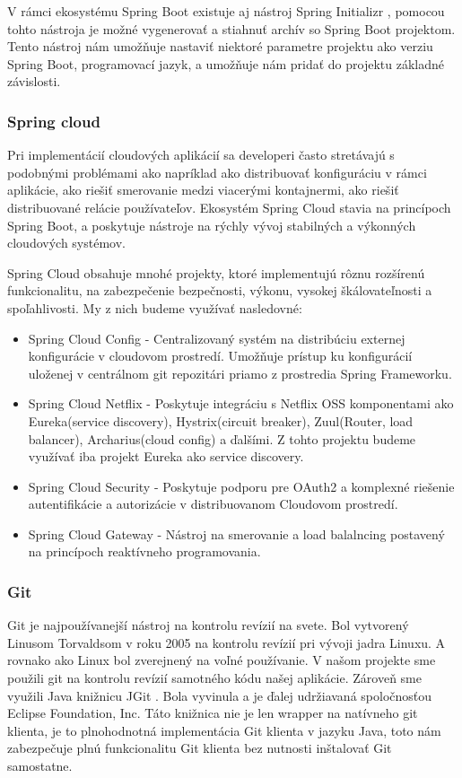 V rámci ekosystému Spring Boot existuje aj nástroj Spring Initializr \cite{initializr}, pomocou tohto nástroja je možné vygenerovať a stiahnuť archív so Spring Boot projektom. Tento nástroj nám umožňuje nastaviť niektoré parametre projektu ako verziu Spring Boot, programovací jazyk, a umožňuje nám pridať do projektu základné závislosti.   

\subsubsection{Spring cloud}
Pri implementácií cloudových aplikácií sa developeri často stretávajú s podobnými problémami ako napríklad ako distribuovať konfiguráciu v rámci aplikácie, ako riešiť smerovanie medzi viacerými kontajnermi, ako riešiť distribuované relácie používateľov. Ekosystém Spring Cloud stavia na princípoch Spring Boot, a poskytuje nástroje na rýchly vývoj stabilných a výkonných cloudových systémov. 

Spring Cloud obsahuje mnohé projekty, ktoré implementujú rôznu rozšírenú funkcionalitu, na zabezpečenie bezpečnosti, výkonu, vysokej škálovateľnosti a spoľahlivosti.
My z nich budeme využívať nasledovné:
\begin{itemize}
\item Spring Cloud Config - Centralizovaný systém na distribúciu externej konfigurácie v cloudovom prostredí. Umožňuje prístup ku konfigurácií uloženej v centrálnom git repozitári priamo z prostredia Spring Frameworku.
\item Spring Cloud Netflix - Poskytuje integráciu s Netflix OSS komponentami ako Eureka(service discovery), Hystrix(circuit breaker), Zuul(Router, load balancer), Archarius(cloud config) a ďalšími. Z tohto projektu budeme využívať iba projekt Eureka ako service discovery.
\item Spring Cloud Security - Poskytuje podporu pre OAuth2 a komplexné riešenie autentifikácie a autorizácie v distribuovanom Cloudovom prostredí.
\item Spring Cloud Gateway - Nástroj na smerovanie a load balalncing postavený na princípoch reaktívneho programovania.
\end{itemize}




\subsubsection{Git}
Git je najpoužívanejší nástroj na kontrolu revízií na svete. Bol vytvorený Linusom Torvaldsom v roku 2005 na kontrolu revízií pri vývoji jadra Linuxu. A rovnako ako Linux bol zverejnený na voľné používanie. V našom projekte sme použili git na kontrolu revízií samotného kódu našej aplikácie. Zároveň sme využili Java knižnicu JGit \cite{jgit}. Bola vyvinula a je ďalej udržiavaná spoločnosťou Eclipse Foundation, Inc. Táto knižnica nie je len wrapper na natívneho git klienta, je to plnohodnotná implementácia Git klienta v jazyku Java, toto nám zabezpečuje plnú funkcionalitu Git klienta bez nutnosti inštalovať Git samostatne. 

